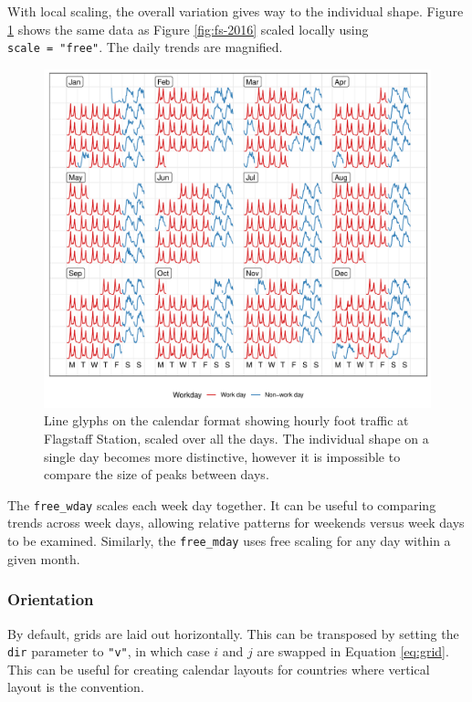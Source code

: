 \documentclass[12pt]{article}
\begin{document}
With local scaling, the overall variation gives way to the individual
shape. Figure \ref{fig:fs-free} shows the same data as Figure
\ref{fig:fs-2016} scaled locally using \texttt{scale\ =\ "free"}. The
daily trends are magnified.

\begin{figure}

{\centering \includegraphics[width=\textwidth]{figure/fs-free-1} 

}

\caption{Line glyphs on the calendar format showing hourly foot traffic at Flagstaff Station, scaled over all the days. The individual shape on a single day becomes more distinctive, however it is impossible to compare the size of peaks between days.}\label{fig:fs-free}
\end{figure}

The \texttt{free\_wday} scales each week day together. It can be useful
to comparing trends across week days, allowing relative patterns for
weekends versus week days to be examined. Similarly, the
\texttt{free\_mday} uses free scaling for any day within a given month.

\hypertarget{orientation}{%
\subsubsection{Orientation}\label{orientation}}

By default, grids are laid out horizontally. This can be transposed by
setting the \texttt{dir} parameter to \texttt{"v"}, in which case \(i\)
and \(j\) are swapped in Equation \ref{eq:grid}. This can be useful for
creating calendar layouts for countries where vertical layout is the
convention.
\end{document}
